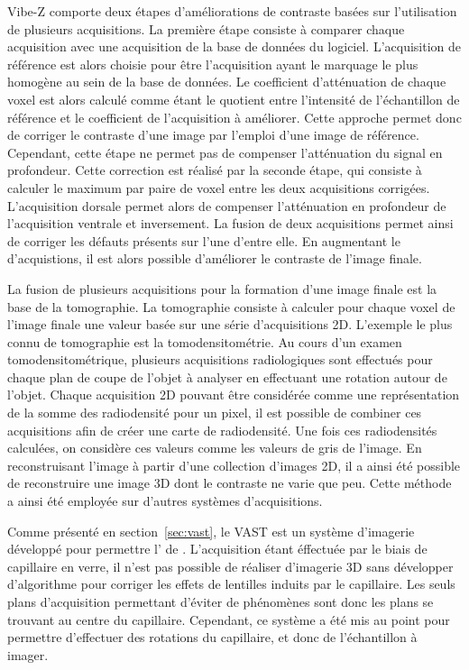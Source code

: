 \documentclass[\main/main.tex]{subfiles}
\begin{document}
%
Vibe-Z comporte deux étapes d'améliorations de contraste basées sur l'utilisation de plusieurs acquisitions. La première étape consiste à comparer chaque acquisition avec une acquisition de la base de données du logiciel.
%
L'acquisition de référence est alors choisie pour être l'acquisition ayant le marquage le plus homogène au sein de la base de données.
%
Le coefficient d'atténuation de chaque voxel est alors calculé comme étant le quotient entre l'intensité de l'échantillon de référence et le coefficient de l'acquisition à améliorer.
%
Cette approche permet donc de corriger le contraste d'une image par l'emploi d'une image de référence.
%
Cependant, cette étape ne permet pas de compenser l'atténuation du signal en profondeur.
%
Cette correction est réalisé par la seconde étape, qui consiste à calculer le maximum par paire de voxel entre les deux acquisitions corrigées.
%
L'acquisition dorsale permet alors de compenser l'atténuation en profondeur de l'acquisition ventrale et inversement.
%
La fusion de deux acquisitions permet ainsi de corriger les défauts présents sur l'une d'entre elle.
%
En augmentant le  d'acquistions, il est alors possible d'améliorer le contraste de l'image finale.

%
La fusion de plusieurs acquisitions pour la formation d'une image finale est la base de la tomographie.
%
La tomographie consiste à calculer pour chaque voxel de l'image finale une valeur basée sur une série d'acquisitions 2D.
%
L'exemple le plus connu de tomographie est la tomodensitométrie\cite{hounsfield_1973}.
%
Au cours d'un examen tomodensitométrique, plusieurs acquisitions radiologiques sont effectués pour chaque plan de coupe de l'objet à analyser en effectuant une rotation autour de l'objet.
%
Chaque acquisition 2D pouvant être considérée comme une représentation de la somme des radiodensité pour un pixel,
il est possible de combiner ces acquisitions afin de créer une carte de radiodensité.
%
Une fois ces radiodensités calculées, on considère ces valeurs comme les valeurs de gris de l'image.
%
En reconstruisant l'image à partir d'une collection d'images 2D, il a ainsi été possible de reconstruire une image 3D dont le contraste ne varie que peu.
%
Cette méthode a ainsi été employée sur d'autres systèmes d'acquisitions.

%
Comme présenté en section~\ref{sec:vast}, le VAST\cite{pardomartin_2010} est un système d'imagerie développé pour permettre l'\hti{} de \pz{}.
%
L'acquisition étant éffectuée par le biais de capillaire en verre, il n'est pas possible de réaliser d'imagerie 3D sans développer d'algorithme pour corriger les effets de lentilles induits par le capillaire.
%
Les seuls plans d'acquisition permettant d'éviter de phénomènes sont donc les plans se trouvant au centre du capillaire.
%
Cependant, ce système a été mis au point pour permettre d'effectuer des rotations du capillaire, et donc de l'échantillon à imager.
\end{document}
